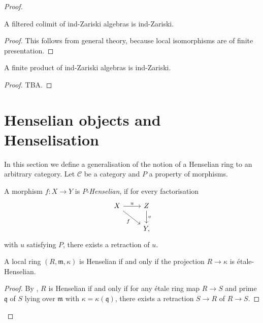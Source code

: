\begin{proof}
\begin{lemma}
    A filtered colimit of ind-Zariski algebras is ind-Zariski.
    \label{lemma:ind-ind-Zariski}
\end{lemma}

\begin{proof}
    This follows from general theory, because local isomorphisms are of finite presentation.
\end{proof}

\begin{lemma}
    A finite product of ind-Zariski algebras is ind-Zariski.
    \label{lemma:ind-Zariski-products}
\end{lemma}

\begin{proof}
    TBA.
\end{proof}

\section{Henselian objects and Henselisation}

In this section we define a generalisation of the notion of a Henselian ring to an arbitrary category. Let $\mathcal{C}$ be a category
and $P$ a property of morphisms.

\begin{definition}[Henselian]
    A morphism $f\colon X \to Y$ is $P$-\emph{Henselian}, if for every factorisation
    \[
    \begin{tikzcd}
        X \arrow{r}{u} \arrow[swap]{dr}{f} & Z \arrow{d}{v} \\
                    & Y,
    \end{tikzcd}
    \] with $u$ satisfying $P$, there exists a retraction of $u$.
\end{definition}

\begin{example}
    A local ring $(R, \mathfrak{m}, \kappa)$ is Henselian if and only if the projection $R \to \kappa$ is étale-Henselian.
\end{example}

\begin{proof}
    By {\cite[\href{https://stacks.math.columbia.edu/tag/04GG}{Tag 04GG}]{stacks-project}}, $R$ is Henselian if and only if
    for any étale ring map $R \to S$ and prime $\mathfrak{q}$ of $S$ lying over $\mathfrak{m}$ with $\kappa = \kappa(\mathfrak{q})$,
    there exists a retraction $S \to R$ of $R \to S$.


\end{proof}
\end{proof}
